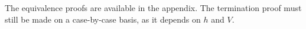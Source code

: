 \begin{corollary}\label{corollary}
\corollaryBody
\end{corollary}
The equivalence proofs are available in the appendix. The termination proof must still be made on a case-by-case basis, as it depends on $h$ and $V$.











